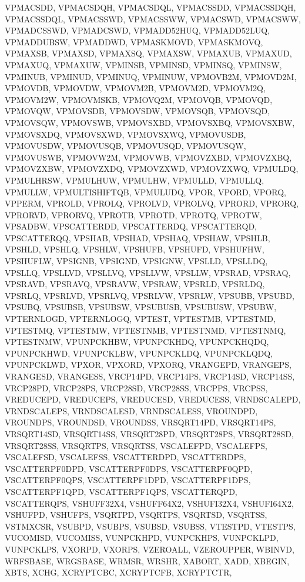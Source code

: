 {{VPMACSDD, VPMACSDQH, VPMACSDQL, VPMACSSDD, VPMACSSDQH, VPMACSSDQL, VPMACSSWD,
VPMACSSWW, VPMACSWD, VPMACSWW, VPMADCSSWD, VPMADCSWD, VPMADD52HUQ, VPMADD52LUQ,
VPMADDUBSW, VPMADDWD, VPMASKMOVD, VPMASKMOVQ, VPMAXSB, VPMAXSD, VPMAXSQ,
VPMAXSW, VPMAXUB, VPMAXUD, VPMAXUQ, VPMAXUW, VPMINSB, VPMINSD, VPMINSQ, VPMINSW,
VPMINUB, VPMINUD, VPMINUQ, VPMINUW, VPMOVB2M, VPMOVD2M, VPMOVDB, VPMOVDW,
VPMOVM2B, VPMOVM2D, VPMOVM2Q, VPMOVM2W, VPMOVMSKB, VPMOVQ2M, VPMOVQB, VPMOVQD,
VPMOVQW, VPMOVSDB, VPMOVSDW, VPMOVSQB, VPMOVSQD, VPMOVSQW, VPMOVSWB, VPMOVSXBD,
VPMOVSXBQ, VPMOVSXBW, VPMOVSXDQ, VPMOVSXWD, VPMOVSXWQ, VPMOVUSDB, VPMOVUSDW,
VPMOVUSQB, VPMOVUSQD, VPMOVUSQW, VPMOVUSWB, VPMOVW2M, VPMOVWB, VPMOVZXBD,
VPMOVZXBQ, VPMOVZXBW, VPMOVZXDQ, VPMOVZXWD, VPMOVZXWQ, VPMULDQ, VPMULHRSW,
VPMULHUW, VPMULHW, VPMULLD, VPMULLQ, VPMULLW, VPMULTISHIFTQB, VPMULUDQ, VPOR,
VPORD, VPORQ, VPPERM, VPROLD, VPROLQ, VPROLVD, VPROLVQ, VPRORD, VPRORQ, VPRORVD,
VPRORVQ, VPROTB, VPROTD, VPROTQ, VPROTW, VPSADBW, VPSCATTERDD, VPSCATTERDQ,
VPSCATTERQD, VPSCATTERQQ, VPSHAB, VPSHAD, VPSHAQ, VPSHAW, VPSHLB, VPSHLD,
VPSHLQ, VPSHLW, VPSHUFB, VPSHUFD, VPSHUFHW, VPSHUFLW, VPSIGNB, VPSIGND, VPSIGNW,
VPSLLD, VPSLLDQ, VPSLLQ, VPSLLVD, VPSLLVQ, VPSLLVW, VPSLLW, VPSRAD, VPSRAQ,
VPSRAVD, VPSRAVQ, VPSRAVW, VPSRAW, VPSRLD, VPSRLDQ, VPSRLQ, VPSRLVD, VPSRLVQ,
VPSRLVW, VPSRLW, VPSUBB, VPSUBD, VPSUBQ, VPSUBSB, VPSUBSW, VPSUBUSB, VPSUBUSW,
VPSUBW, VPTERNLOGD, VPTERNLOGQ, VPTEST, VPTESTMB, VPTESTMD, VPTESTMQ, VPTESTMW,
VPTESTNMB, VPTESTNMD, VPTESTNMQ, VPTESTNMW, VPUNPCKHBW, VPUNPCKHDQ, VPUNPCKHQDQ,
VPUNPCKHWD, VPUNPCKLBW, VPUNPCKLDQ, VPUNPCKLQDQ, VPUNPCKLWD, VPXOR, VPXORD,
VPXORQ, VRANGEPD, VRANGEPS, VRANGESD, VRANGESS, VRCP14PD, VRCP14PS, VRCP14SD,
VRCP14SS, VRCP28PD, VRCP28PS, VRCP28SD, VRCP28SS, VRCPPS, VRCPSS, VREDUCEPD,
VREDUCEPS, VREDUCESD, VREDUCESS, VRNDSCALEPD, VRNDSCALEPS, VRNDSCALESD,
VRNDSCALESS, VROUNDPD, VROUNDPS, VROUNDSD, VROUNDSS, VRSQRT14PD, VRSQRT14PS,
VRSQRT14SD, VRSQRT14SS, VRSQRT28PD, VRSQRT28PS, VRSQRT28SD, VRSQRT28SS,
VRSQRTPS, VRSQRTSS, VSCALEFPD, VSCALEFPS, VSCALEFSD, VSCALEFSS, VSCATTERDPD,
VSCATTERDPS, VSCATTERPF0DPD, VSCATTERPF0DPS, VSCATTERPF0QPD, VSCATTERPF0QPS,
VSCATTERPF1DPD, VSCATTERPF1DPS, VSCATTERPF1QPD, VSCATTERPF1QPS, VSCATTERQPD,
VSCATTERQPS, VSHUFF32X4, VSHUFF64X2, VSHUFI32X4, VSHUFI64X2, VSHUFPD, VSHUFPS,
VSQRTPD, VSQRTPS, VSQRTSD, VSQRTSS, VSTMXCSR, VSUBPD, VSUBPS, VSUBSD, VSUBSS,
VTESTPD, VTESTPS, VUCOMISD, VUCOMISS, VUNPCKHPD, VUNPCKHPS, VUNPCKLPD,
VUNPCKLPS, VXORPD, VXORPS, VZEROALL, VZEROUPPER, WBINVD, WRFSBASE, WRGSBASE,
WRMSR, WRSHR, XABORT, XADD, XBEGIN, XBTS, XCHG, XCRYPTCBC, XCRYPTCFB, XCRYPTCTR,
}}
